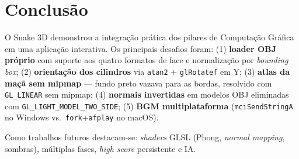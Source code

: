 \documentclass[12pt]{article}
\begin{document}
\section{Conclusão}

O Snake 3D demonstrou a integração prática dos pilares de Computação Gráfica em uma aplicação interativa. Os principais desafios foram: (1) \textbf{loader OBJ próprio} com suporte aos quatro formatos de face e normalização por \textit{bounding box}; (2) \textbf{orientação dos cilindros} via \texttt{atan2} + \texttt{glRotatef} em Y; (3) \textbf{atlas da maçã sem mipmap} — fundo preto vazava para as bordas, resolvido com \texttt{GL\_LINEAR} sem mipmap; (4) \textbf{normais invertidas} em modelos OBJ eliminadas com \texttt{GL\_LIGHT\_MODEL\_TWO\_SIDE}; (5) \textbf{BGM multiplataforma} (\texttt{mciSendStringA} no Windows vs.\ \texttt{fork}+\texttt{afplay} no macOS).

Como trabalhos futuros destacam-se: \textit{shaders} GLSL (Phong, \textit{normal mapping}, sombras), múltiplas fases, \textit{high score} persistente e IA.



\end{document}

